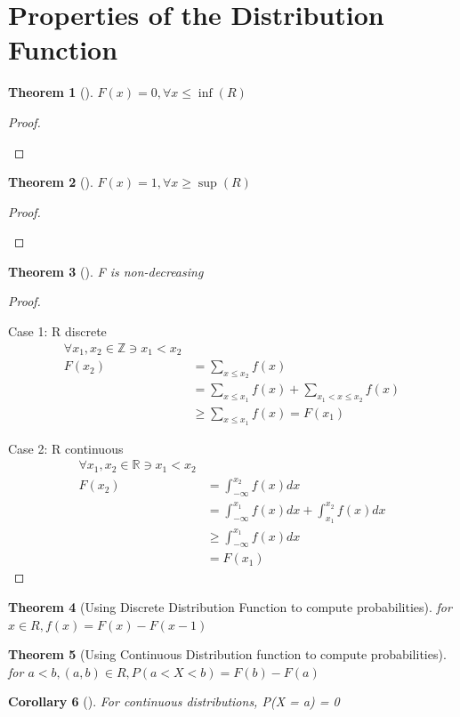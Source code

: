 \documentclass[10pt,]{book}
\theoremstyle{plain}
\newtheorem{theorem}{Theorem}[section]
\newtheorem{corollary}[theorem]{Corollary}
\theoremstyle{definition}
\theoremstyle{definition}
\numberwithin{equation}{section}
\newcommand{\lt}{ < }
\begin{document}
\section[Properties of the Distribution Function]{Properties of the Distribution Function}\label{section-24}
\begin{theorem}[]\label{theorem-Fmin}
\(F(x)=0, \forall x \le \inf(R)\)\end{theorem}
\begin{proof}\hypertarget{proof-19}{}
\end{proof}
\begin{theorem}[]\label{theorem-Fmax}
\(F(x)=1, \forall x \ge \sup(R)\)\end{theorem}
\begin{proof}\hypertarget{proof-20}{}
\end{proof}
\begin{theorem}[]\label{theorem-26}
F is non-decreasing\end{theorem}
\begin{proof}\hypertarget{proof-21}{}
Case 1: R discrete%
\begin{align*}
\forall x_1,x_2 \in \mathbb{Z} \ni x_1 \lt x_2\\
F(x_2) & = \sum_{x \le x_2} f(x) \\
& = \sum_{x \le x_1} f(x) + \sum_{x_1 \lt x \le x_2} f(x)\\
& \ge \sum_{x \le x_1} f(x) = F(x_1)
\end{align*}\par
Case 2: R continuous%
\begin{align*}
\forall x_1,x_2 \in \mathbb{R} \ni x_1 \lt x_2\\
F(x_2) & = \int_{-\infty}^{x_2} f(x) dx \\
 & = \int_{-\infty}^{x_1} f(x) dx + \int_{x_1}^{x_2} f(x) dx\\
 & \ge \int_{-\infty}^{x_1} f(x) dx\\
 & = F(x_1)
\end{align*}\end{proof}
\begin{theorem}[Using Discrete Distribution Function to compute probabilities]\label{theorem-Fvsf-discrete}
for \(x \in R, f(x) = F(x) - F(x-1)\)\end{theorem}
\begin{theorem}[Using Continuous Distribution function to compute probabilities]\label{theorem-Fvsf-continuyous}
for \(a \lt b, (a,b) \in R, P(a \lt X \lt b) = F(b) - F(a)\)\end{theorem}
\begin{corollary}[]\label{corollary-ProbPointZero-continuous}
For continuous distributions, P(X = a) = 0\end{corollary}
\typeout{************************************************}
\typeout{************************************************}
\end{document}
